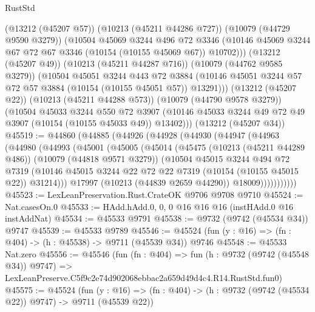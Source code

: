 \begin{lexlean}{RustStd}
\begin{coremodule}
          (@13212 (@45207 @57))
          (@10213 (@45211 @44286 @727))
          (@10079 (@44729 @9590 @3279))
          (@10504
            @45069
            @3244
            @496
            @72
            @3346
            (@10146 @45069 @3244 @67 @72 @67 @3346 (@10154 (@10155 @45069 @67)) @10702)))
        (@13212 (@45207 @49))
        (@10213 (@45211 @44287 @716))
        (@10079 (@44762 @9585 @3279))
        (@10504
          @45051
          @3244
          @443
          @72
          @3884
          (@10146 @45051 @3244 @57 @72 @57 @3884 (@10154 (@10155 @45051 @57)) @13291)))
      (@13212 (@45207 @22))
      (@10213 (@45211 @44288 @573))
      (@10079 (@44790 @9578 @3279))
      (@10504
        @45033
        @3244
        @550
        @72
        @3907
        (@10146 @45033 @3244 @49 @72 @49 @3907 (@10154 (@10155 @45033 @49)) @13402)))
    (@13212 (@45207 @34))
@45519 := @44860
    (@44885
      (@44926
        (@44928
          (@44930
            (@44947
              (@44963
                (@44980
                  (@44993
                    (@45001
                      (@45005
                        (@45014
                          (@45475
                            (@10213 (@45211 @44289 @486))
                            (@10079 (@44818 @9571 @3279))
                            (@10504
                              @45015
                              @3244
                              @494
                              @72
                              @7319
                              (@10146
                                @45015
                                @3244
                                @22
                                @72
                                @22
                                @7319
                                (@10154 (@10155 @45015 @22))
                                @31214)))
                          @17997
                          (@10213 (@44839 @2659 @44290))
                          @18009)))))))))))
@45523 := LexLeanPreservation.Rust.CrateOK @9706 @9708 @9710
@45524 := Nat.casesOn.{0}
@45533 := HAdd.hAdd.{0, 0, 0} @16 @16 @16 (instHAdd.{0} @16 instAddNat)
@45534 := @45533 @9791
@45538 := @9732 (@9742 (@45534 @34)) @9747
@45539 := @45533 @9789
@45546 := @45524 (fun (y : @16) => (fn : @404) -> (h : @45538) -> @9711 (@45539 @34)) @9746
@45548 := @45533 Nat.zero
@45556 := @45546
    (fun (fn : @404) =>
    fun (h : @9732 (@9742 (@45548 @34)) @9747) =>
    LexLeanPreserve.C5f9c2e74d902068ebbac2a659d49d4c4.R14.RustStd.fun0)
@45575 := @45524
    (fun (y : @16) => (fn : @404) -> (h : @9732 (@9742 (@45534 @22)) @9747) -> @9711 (@45539 @22))

\end{coremodule}
\end{lexlean}
